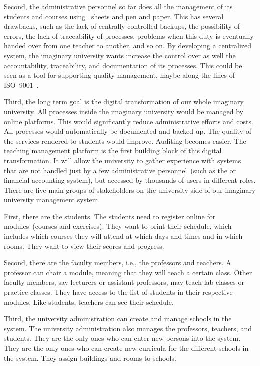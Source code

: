 Second, the administrative personnel so far does all the management of its students and courses using \microsoftExcel\ sheets and pen and paper.
This has several drawbacks, such as the lack of centrally controlled backups, the possibility of errors, the lack of traceability of processes, problems when this duty is eventually handed over from one teacher to another, and so on.
By developing a centralized system, the imaginary university wants increase the control over as well the accountability, traceability, and documentation of its processes.
This could be seen as a tool for supporting quality management, maybe along the lines of ISO~9001~\cite{ISO180912019,ISO90012015}.

Third, the long term goal is the digital transformation of our whole imaginary university.
All processes inside the imaginary university would be managed by online platforms.
This would significantly reduce administrative efforts and costs.
All processes would automatically be documented and backed up.
The quality of the services rendered to students would improve.
Auditing becomes easier.
The teaching management platform is the first building block of this digital transformation.
It will allow the university to gather experience with systems that are not handled just by a few administrative personnel~(such as the  or financial accounting system), but accessed by thousands of users in different roles.%
%
\endhsection%
%
%
%
There are five main groups of stakeholders on the university side of our imaginary university management system.

First, there are the students.
The students need to register online for modules~(courses and exercises).
They want to print their schedule, which includes which courses they will attend at which days and times and in which rooms.
They want to view their scores and progress.

Second, there are the faculty members, i.e., the professors and teachers.
A professor can chair a module, meaning that they will teach a certain class.
Other faculty members, say lecturers or assistant professors, may teach lab classes or practice classes.
They have access to the list of students in their respective modules.
Like students, teachers can see their schedule.

Third, the university administration can create and manage schools in the system.
The university administration also manages the professors, teachers, and students.
They are the only ones who can enter new persons into the system.
They are the only ones who can create new curricula for the different schools in the system.
They assign buildings and rooms to schools.

